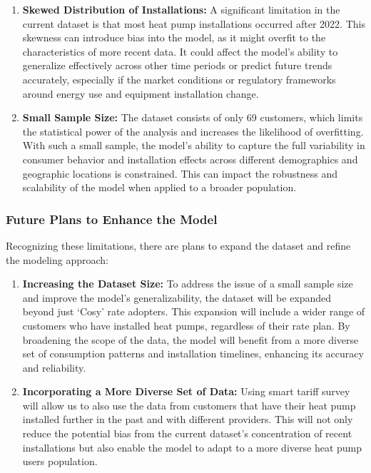 \documentclass[
]{article}
\begin{document}
\begin{enumerate}
\def\labelenumi{\arabic{enumi}.}
\item
  \textbf{Skewed Distribution of Installations:}
  A significant limitation in the current dataset is that most heat pump installations occurred after 2022. This skewness can introduce bias into the model, as it might overfit to the characteristics of more recent data. It could affect the model's ability to generalize effectively across other time periods or predict future trends accurately, especially if the market conditions or regulatory frameworks around energy use and equipment installation change.
\item
  \textbf{Small Sample Size:}
  The dataset consists of only 69 customers, which limits the statistical power of the analysis and increases the likelihood of overfitting. With such a small sample, the model's ability to capture the full variability in consumer behavior and installation effects across different demographics and geographic locations is constrained. This can impact the robustness and scalability of the model when applied to a broader population.
\end{enumerate}

\subsubsection{Future Plans to Enhance the Model}\label{future-plans-to-enhance-the-model}

Recognizing these limitations, there are plans to expand the dataset and refine the modeling approach:

\begin{enumerate}
\def\labelenumi{\arabic{enumi}.}
\item
  \textbf{Increasing the Dataset Size:}
  To address the issue of a small sample size and improve the model's generalizability, the dataset will be expanded beyond just `Cosy' rate adopters. This expansion will include a wider range of customers who have installed heat pumps, regardless of their rate plan. By broadening the scope of the data, the model will benefit from a more diverse set of consumption patterns and installation timelines, enhancing its accuracy and reliability.
\item
  \textbf{Incorporating a More Diverse Set of Data:}
  Using smart tariff survey will allow us to also use the data from customers that have their heat pump installed further in the past and with different providers. This will not only reduce the potential bias from the current dataset's concentration of recent installations but also enable the model to adapt to a more diverse heat pump users population.
\end{enumerate}
\end{document}
